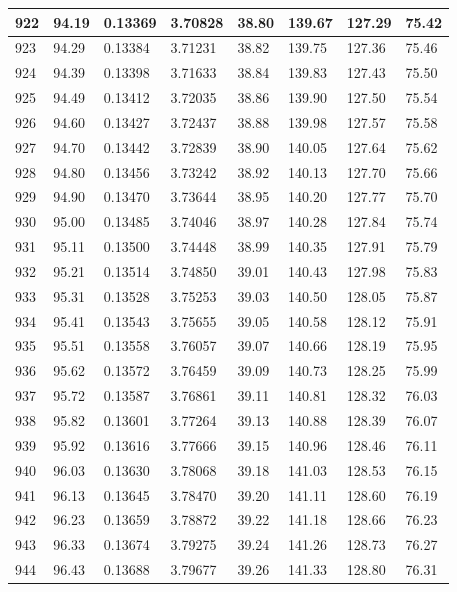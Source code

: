 \documentclass[12pt,a4paper,twoside]{article}
\begin{document}
\begin{center}
\begin{longtable}{l l l l | l l l l}
922 & 94.19 & 0.13369 & 3.70828 & 38.80 & 139.67 & 127.29 & 75.42 \\ \hline
923 & 94.29 & 0.13384 & 3.71231 & 38.82 & 139.75 & 127.36 & 75.46 \\ \hline
924 & 94.39 & 0.13398 & 3.71633 & 38.84 & 139.83 & 127.43 & 75.50 \\ \hline
925 & 94.49 & 0.13412 & 3.72035 & 38.86 & 139.90 & 127.50 & 75.54 \\ \hline
926 & 94.60 & 0.13427 & 3.72437 & 38.88 & 139.98 & 127.57 & 75.58 \\ \hline
927 & 94.70 & 0.13442 & 3.72839 & 38.90 & 140.05 & 127.64 & 75.62 \\ \hline
928 & 94.80 & 0.13456 & 3.73242 & 38.92 & 140.13 & 127.70 & 75.66 \\ \hline
929 & 94.90 & 0.13470 & 3.73644 & 38.95 & 140.20 & 127.77 & 75.70 \\ \hline
930 & 95.00 & 0.13485 & 3.74046 & 38.97 & 140.28 & 127.84 & 75.74 \\ \hline
931 & 95.11 & 0.13500 & 3.74448 & 38.99 & 140.35 & 127.91 & 75.79 \\ \hline
932 & 95.21 & 0.13514 & 3.74850 & 39.01 & 140.43 & 127.98 & 75.83 \\ \hline
933 & 95.31 & 0.13528 & 3.75253 & 39.03 & 140.50 & 128.05 & 75.87 \\ \hline
934 & 95.41 & 0.13543 & 3.75655 & 39.05 & 140.58 & 128.12 & 75.91 \\ \hline
935 & 95.51 & 0.13558 & 3.76057 & 39.07 & 140.66 & 128.19 & 75.95 \\ \hline
936 & 95.62 & 0.13572 & 3.76459 & 39.09 & 140.73 & 128.25 & 75.99 \\ \hline
937 & 95.72 & 0.13587 & 3.76861 & 39.11 & 140.81 & 128.32 & 76.03 \\ \hline
938 & 95.82 & 0.13601 & 3.77264 & 39.13 & 140.88 & 128.39 & 76.07 \\ \hline
939 & 95.92 & 0.13616 & 3.77666 & 39.15 & 140.96 & 128.46 & 76.11 \\ \hline
940 & 96.03 & 0.13630 & 3.78068 & 39.18 & 141.03 & 128.53 & 76.15 \\ \hline
941 & 96.13 & 0.13645 & 3.78470 & 39.20 & 141.11 & 128.60 & 76.19 \\ \hline
942 & 96.23 & 0.13659 & 3.78872 & 39.22 & 141.18 & 128.66 & 76.23 \\ \hline
943 & 96.33 & 0.13674 & 3.79275 & 39.24 & 141.26 & 128.73 & 76.27 \\ \hline
944 & 96.43 & 0.13688 & 3.79677 & 39.26 & 141.33 & 128.80 & 76.31 \\ \hline

\end{longtable}
\end{center}
\end{document}
